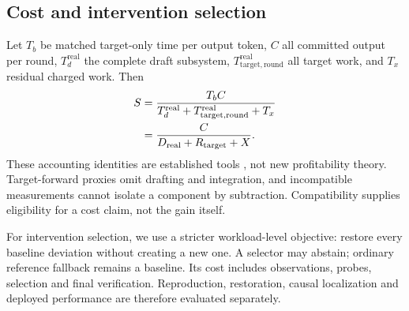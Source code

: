 \subsection{Cost and intervention selection}
Let $T_b$ be matched target-only time per output token, $C$ all committed output per round, $T_d^{\mathrm{real}}$ the complete draft subsystem, $T_{\mathrm{target,round}}^{\mathrm{real}}$ all target work, and $T_x$ residual charged work. Then
\begin{align}
S&=\frac{T_bC}{T_d^{\mathrm{real}}+T_{\mathrm{target,round}}^{\mathrm{real}}+T_x}\label{eq:physical}\\
 &=\frac{C}{D_{\mathrm{real}}+R_{\mathrm{target}}+X}.\label{eq:normalized}
\end{align}
These accounting identities are established tools \citep{specllm}, not new profitability theory. Target-forward proxies omit drafting and integration, and incompatible measurements cannot isolate a component by subtraction. Compatibility supplies eligibility for a cost claim, not the gain itself.

For intervention selection, we use a stricter workload-level objective: restore every baseline deviation without creating a new one. A selector may abstain; ordinary reference fallback remains a baseline. Its cost includes observations, probes, selection and final verification. Reproduction, restoration, causal localization and deployed performance are therefore evaluated separately.
